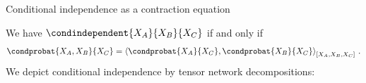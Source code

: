 \documentclass{beamer}
\begin{document}
    \begin{frame}{Conditional independence as a contraction equation}

        We have $ \condindependent{\catvariableof{\nodesa}}{\catvariableof{\nodesb}}{\catvariableof{\nodesc}} $ if and only if
        \begin{align*}
            \condprobat{\catvariableof{\nodesa},\catvariableof{\nodesb}}{\catvariableof{\nodesc}}
            = \contractionof{
                \condprobat{\catvariableof{\nodesa}}{\catvariableof{\nodesc}},
                \condprobat{\catvariableof{\nodesb}}{\catvariableof{\nodesc}}
            }{\catvariableof{\nodesa},\catvariableof{\nodesb},\catvariableof{\nodesc}} \, .
        \end{align*}
        We depict conditional independence by tensor network decompositions:
        \begin{center}
            
        \end{center}

    \end{frame}
\end{document}

